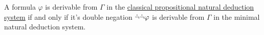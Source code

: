 \begin{theorem}\label{thm:glivenkos_double_negation_theorem}
  A formula \( \varphi \) is derivable from \( \Gamma \) in the \hyperref[def:propositional_natural_deduction_systems]{classical propositional natural deduction system} if and only if it's double negation \( \dot\neg \dot\neg \varphi \) is derivable from \( \Gamma \) in the minimal natural deduction system.
\end{theorem}
